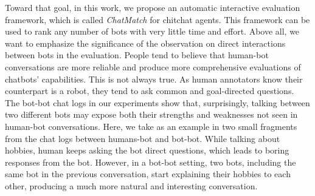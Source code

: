 Toward that goal, in this work, we propose an automatic interactive evaluation framework, 
which is called \textit{ChatMatch} for chitchat
agents. This framework can be used to rank any number of bots with very little
time and effort.  Above all, we want to emphasize the significance of
the observation on direct interactions between bots in the evaluation. 
People tend to believe that human-bot conversations are more reliable 
and produce more comprehensive evaluations of chatbots' capabilities. 
This is not always true. As human annotators know their counterpart is a robot, 
they tend to ask common and goal-directed questions. 
The bot-bot chat logs in our experiments show that, surprisingly,  
talking between two different bots may expose both their strengths and weaknesses not seen
in human-bot conversations. 
Here, we take as an example in  two small fragments 
from the chat logs between humans-bot and bot-bot. While talking about hobbies, 
human keeps asking the bot direct questions, which leads to boring responses from the bot.
However, in a bot-bot setting, two bots, including the same bot in the previous
conversation, start explaining their hobbies to each other, producing a much more natural and 
interesting conversation. 

